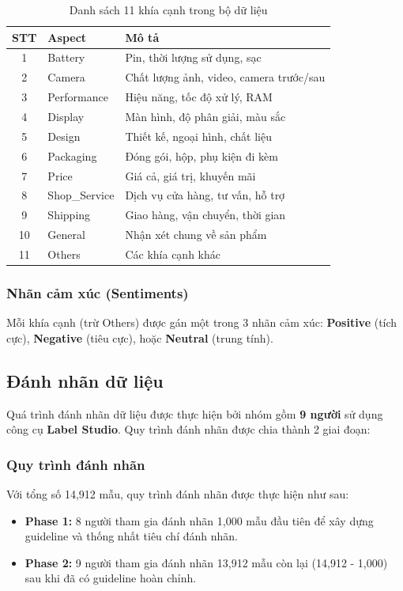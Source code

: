 \begin{table}[H]
\centering
\begin{tabular}{|c|l|l|}
\hline
\textbf{STT} & \textbf{Aspect} & \textbf{Mô tả} \\
\hline
1 & Battery & Pin, thời lượng sử dụng, sạc \\
\hline
2 & Camera & Chất lượng ảnh, video, camera trước/sau \\
\hline
3 & Performance & Hiệu năng, tốc độ xử lý, RAM \\
\hline
4 & Display & Màn hình, độ phân giải, màu sắc \\
\hline
5 & Design & Thiết kế, ngoại hình, chất liệu \\
\hline
6 & Packaging & Đóng gói, hộp, phụ kiện đi kèm \\
\hline
7 & Price & Giá cả, giá trị, khuyến mãi \\
\hline
8 & Shop\_Service & Dịch vụ cửa hàng, tư vấn, hỗ trợ \\
\hline
9 & Shipping & Giao hàng, vận chuyển, thời gian \\
\hline
10 & General & Nhận xét chung về sản phẩm \\
\hline
11 & Others & Các khía cạnh khác \\
\hline
\end{tabular}
\caption{Danh sách 11 khía cạnh trong bộ dữ liệu}
\label{tab:aspects-list}
\end{table}

\subsubsection{Nhãn cảm xúc (Sentiments)}
Mỗi khía cạnh (trừ Others) được gán một trong 3 nhãn cảm xúc: \textbf{Positive} (tích cực), \textbf{Negative} (tiêu cực), hoặc \textbf{Neutral} (trung tính).

\subsection{Đánh nhãn dữ liệu}

Quá trình đánh nhãn dữ liệu được thực hiện bởi nhóm gồm \textbf{9 người} sử dụng công cụ \textbf{Label Studio}. Quy trình đánh nhãn được chia thành 2 giai đoạn:

\subsubsection{Quy trình đánh nhãn}
Với tổng số 14,912 mẫu, quy trình đánh nhãn được thực hiện như sau:
\begin{itemize}
    \item \textbf{Phase 1:} 8 người tham gia đánh nhãn 1,000 mẫu đầu tiên để xây dựng guideline và thống nhất tiêu chí đánh nhãn.
    \item \textbf{Phase 2:} 9 người tham gia đánh nhãn 13,912 mẫu còn lại (14,912 - 1,000) sau khi đã có guideline hoàn chỉnh.
\end{itemize}

